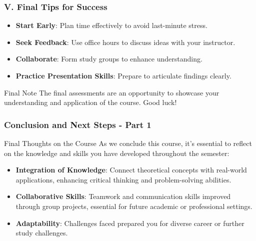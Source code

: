 \documentclass{beamer}
\begin{document}
\begin{frame}[fragile]
    \frametitle{V. Final Tips for Success}
    \begin{itemize}
        \item \textbf{Start Early}: Plan time effectively to avoid last-minute stress.
        \item \textbf{Seek Feedback}: Use office hours to discuss ideas with your instructor.
        \item \textbf{Collaborate}: Form study groups to enhance understanding.
        \item \textbf{Practice Presentation Skills}: Prepare to articulate findings clearly.
    \end{itemize}

    \begin{block}{Final Note}
        The final assessments are an opportunity to showcase your understanding and application of the course. Good luck!
    \end{block}
\end{frame}

\begin{frame}[fragile]
    \frametitle{Conclusion and Next Steps - Part 1}
    \begin{block}{Final Thoughts on the Course}
        As we conclude this course, it's essential to reflect on the knowledge and skills you have developed throughout the semester:
    \end{block}
    \begin{itemize}
        \item \textbf{Integration of Knowledge}: Connect theoretical concepts with real-world applications, enhancing critical thinking and problem-solving abilities.
        \item \textbf{Collaborative Skills}: Teamwork and communication skills improved through group projects, essential for future academic or professional settings.
        \item \textbf{Adaptability}: Challenges faced prepared you for diverse career or further study challenges.
    \end{itemize}
\end{frame}
\end{document}
